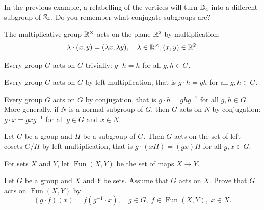 

In the previous example, a relabelling of the vertices 
will turn $\mathbb{D}_4$ into a different subgroup of $\mathbb{S}_4$. Do you remember 
what conjugate subgroups are? 

\begin{example}
    The multiplicative group $\mathbb{R}^{\times}$ acts on the plane $\mathbb{R}^2$ by multiplication: 
    \[ 
    \lambda\cdot (x,y)=(\lambda x,\lambda y),\quad \lambda\in\mathbb{R}^{\times},(x,y)\in\mathbb{R}^2.
    \]
\end{example}

\begin{example}
Every group $G$ acts on $G$ trivially: $g\cdot h=h$ for all $g,h\in G$.
\end{example}

\begin{example}
Every group $G$ acts on $G$ by left multiplication, that is
$g\cdot h=gh$ for all $g,h\in G$.
\end{example}

\begin{example}
Every group $G$ acts on $G$ by conjugation, that is
$g\cdot h=ghg^{-1}$ for all $g,h\in G$. More generally, 
if $N$ is a normal subgroup of $G$, then $G$ acts on
$N$ by conjugation: $g\cdot x=gx
g^{-1}$ for all $g\in G$ and $x\in N$. 
\end{example}

\begin{example}
Let $G$ be a group and $H$ be a subgroup of $G$. Then $G$ 
acts on the set of left cosets $G/H$ by left multiplication, that 
is $g\cdot (xH)=(gx)H$ for all $g,x\in G$.
\end{example}

For sets $X$ and $Y$, let 
$\operatorname{Fun}(X,Y)$ be the set of maps $X\to Y$. 

\begin{exercise}
\label{xca:dual}
    Let $G$ be a group and $X$ and $Y$ be sets. Assume that $G$ acts on $X$. 
    Prove that 
    $G$ acts on $\operatorname{Fun}(X,Y)$ by 
    \[ 
        (g\cdot f)(x)=f(g^{-1}\cdot x),\quad g\in G,\; f\in\operatorname{Fun}(X,Y),\; x\in X.
    \]  
\end{exercise}


